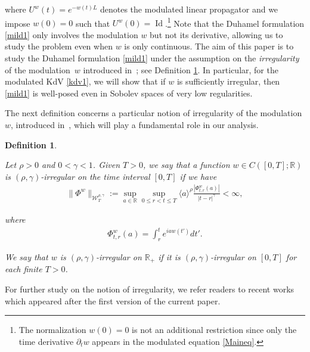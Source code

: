\documentclass[letterpaper, 11pt,  reqno]{amsart}
\newtheorem{definition}[theorem]{Definition}
\DeclareMathOperator{\Id}{Id}
\newcommand{\1}{\hspace{0.5mm}\text{I}\hspace{0.5mm}}
\newcommand{\noi}{\noindent}
\newcommand{\R}{\mathbb{R}}
\newcommand{\g}{\gamma}
\newcommand{\dt}{\partial_t}
\newcommand{\W}{\mathcal{W}}
\numberwithin{equation}{section}
\numberwithin{theorem}{section}
\begin{document}
\noi
where $U^w(t) = e^{- w(t) L }$ denotes the modulated linear propagator
and we impose $w(0) = 0$ such that  
 $U^w(0) = \Id$.\footnote{The normalization $w(0) = 0$
 is not an additional restriction since only the time derivative $\dt w$
 appears in the modulated equation \eqref{Maineq}.}
Note that the Duhamel formulation \eqref{mild1}
only involves the modulation $w$ but not its derivative, 
allowing us to study the problem
even when $w$ is only continuous.
The aim of this paper is to study 
the Duhamel formulation \eqref{mild1} under 
the assumption on the  \emph{irregularity} of the modulation~$w$ 
introduced in~\cite{CatellierGubinelli, CG1};
see Definition \ref{DEF:ir}.
In particular,
for the modulated KdV \eqref{kdv1}, 
we will show that if $w$ is sufficiently irregular,
then \eqref{mild1} is well-posed even in Sobolev spaces
of very low regularities.


The next definition concerns a particular notion of irregularity of the modulation $w$, 
introduced in~\cite{CatellierGubinelli, CG1}, 
which  will play a fundamental role  in our analysis.

\begin{definition}
\label{DEF:ir}
\rm

Let $\rho>0$ and  $0 < \g < 1$.
Given $T > 0$, we say that a function $w\in C([0,T];\R)$ is $(\rho,\g)$-irregular 
on the time interval $[0, T]$  if we have
\begin{align}
\|\Phi^w\|_{  \W^{\rho,\g}_T} 
:= \sup_{a\in \R} \sup_{0\leq r < t\leq T} \langle a \rangle^\rho \frac{\left|\Phi^w_{t,r}(a)\right|}{|t-r|^\g} 
< \infty, 
\label{rho1}
\end{align}


\noi
where 
\begin{align}
\Phi^w_{t,r}(a)
=\int_r^t e^{i  a w(t') } d t'.
\label{rho2}
\end{align}


\noi
We say that $w$ is 
$(\rho,\g)$-irregular 
on $\R_+$  if it is 
$(\rho,\g)$-irregular 
on $[0, T]$ for each finite $T > 0$.


\end{definition}


For further study on the notion of irregularity, 
we refer readers to 
 recent works \cite{GG, RT}
which appeared after the first version of the current paper.
\end{document}
